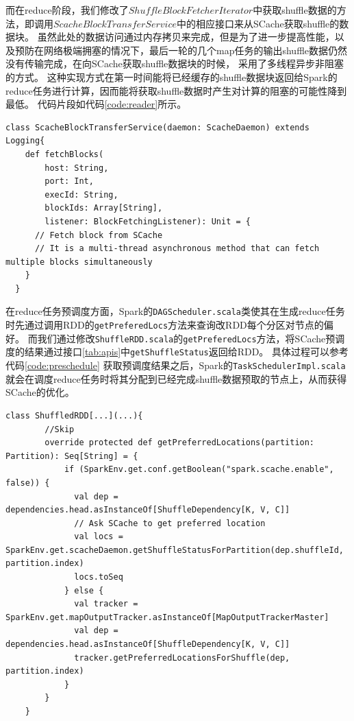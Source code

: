 而在reduce阶段，我们修改了$ShuffleBlockFetcherIterator$中获取shuffle数据的方法，即调用$ScacheBlockTransferService$中的相应接口来从SCache获取shuffle的数据块。
虽然此处的数据访问通过内存拷贝来完成，但是为了进一步提高性能，以及预防在网络极端拥塞的情况下，最后一轮的几个map任务的输出shuffle数据仍然没有传输完成，在向SCache获取shuffle数据块的时候，
采用了多线程异步非阻塞的方式。
这种实现方式在第一时间能将已经缓存的shuffle数据块返回给Spark的reduce任务进行计算，因而能将获取shuffle数据时产生对计算的阻塞的可能性降到最低。
代码片段如代码\ref{code:reader}所示。

\begin{lstlisting}[style={myScalastyle}, caption={ScacheBlockTransferService代码片段}, label={code:reader}]
  class ScacheBlockTransferService(daemon: ScacheDaemon) extends Logging{
    def fetchBlocks(
        host: String,
        port: Int,
        execId: String,
        blockIds: Array[String],
        listener: BlockFetchingListener): Unit = {
      // Fetch block from SCache
      // It is a multi-thread asynchronous method that can fetch multiple blocks simultaneously
    }
  }
\end{lstlisting}

在reduce任务预调度方面，Spark的\verb|DAGScheduler.scala|类使其在生成reduce任务时先通过调用RDD的\verb|getPreferedLocs|方法来查询改RDD每个分区对节点的偏好。
而我们通过修改\verb|ShuffleRDD.scala|的\verb|getPreferedLocs|方法，将SCache预调度的结果通过接口\ref{tab:apis}中\verb|getShuffleStatus|返回给RDD。
具体过程可以参考代码\ref{code:preschedule}
获取预调度结果之后，Spark的\verb|TaskSchedulerImpl.scala|就会在调度reduce任务时将其分配到已经完成shuffle数据预取的节点上，从而获得SCache的优化。

\begin{lstlisting}[style={myScalastyle}, caption={Reduce预调度代码片段}, label={code:preschedule}]
    class ShuffledRDD[...](...){
        //Skip
        override protected def getPreferredLocations(partition: Partition): Seq[String] = {
            if (SparkEnv.get.conf.getBoolean("spark.scache.enable", false)) {
              val dep = dependencies.head.asInstanceOf[ShuffleDependency[K, V, C]]
              // Ask SCache to get preferred location
              val locs = SparkEnv.get.scacheDaemon.getShuffleStatusForPartition(dep.shuffleId, partition.index)
              locs.toSeq
            } else {
              val tracker = SparkEnv.get.mapOutputTracker.asInstanceOf[MapOutputTrackerMaster]
              val dep = dependencies.head.asInstanceOf[ShuffleDependency[K, V, C]]
              tracker.getPreferredLocationsForShuffle(dep, partition.index)
            }
        }
    }
\end{lstlisting}

